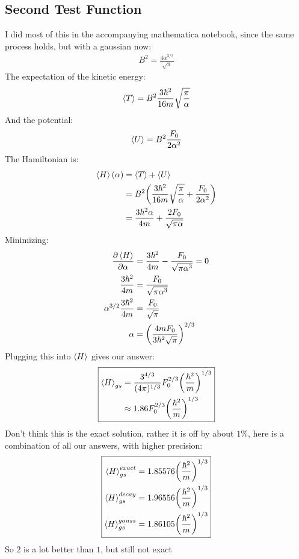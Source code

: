 \documentclass[12pt]{article}
\begin{document}
\subsection{Second Test Function}
I did most of this in the accompanying mathematica notebook, since the same process holds, but with a gaussian now:
\begin{align*}
  B^2=\frac{4\alpha^{3/2}}{\sqrt{\pi}}
\end{align*}
The expectation of the kinetic energy:
\begin{align*}
  \ev{T}=B^2\frac{3\hbar^2}{16m}\sqrt{\frac\pi\alpha}
\end{align*}
And the potential:
\begin{align*}
  \ev{U}=B^2\frac{F_0}{2\alpha^2}
\end{align*}
The Hamiltonian is:
\begin{align*}
  \ev{H}(\alpha)&=\ev{T}+\ev{U}\\
  &=B^2\qty(\frac{3\hbar^2}{16m}\sqrt{\frac{\pi}{\alpha}}+
  \frac{F_0}{2\alpha^2})\\
  &=\frac{3\hbar^2\alpha}{4m}+\frac{2F_0}{\sqrt{\pi\alpha}}
\end{align*}
Minimizing:
\begin{align*}
  \pdv{\ev{H}}{\alpha}&=\frac{3\hbar^2}{4m}-\frac{F_0}{\sqrt{\pi\alpha^3}}=0\\
  \frac{3\hbar^2}{4m}&=\frac{F_0}{\sqrt{\pi\alpha^3}}\\
  \alpha^{3/2}\frac{3\hbar^2}{4m}&=\frac{F_0}{\sqrt{\pi}}\\
  \alpha&=\qty(\frac{4mF_0}{3\hbar^2\sqrt{\pi}})^{2/3}
\end{align*}
Plugging this into $\ev{H}$ gives our answer:
\begin{equation}
  \boxed{\begin{aligned}
    \ev{H}_{gs}&=\frac{3^{4/3}}{(4\pi)^{1/3}}
    F_0^{2/3}\qty(\frac{\hbar^2}{m})^{1/3}\\
    &\approx1.86F_0^{2/3}\qty(\frac{\hbar^2}{m})^{1/3}
  \end{aligned}}
\end{equation}
Don't think this is the exact solution, rather it is off by about $1\%$, here is a combination of all our answers, with higher precision:
\begin{equation}
\boxed{  \begin{aligned}
    \ev{H}_{gs}^{exact}&=1.85576\qty(\frac{\hbar^2}m)^{1/3}\\
    \ev{H}_{gs}^{decay}&=1.96556\qty(\frac{\hbar^2}m)^{1/3}\\
    \ev{H}_{gs}^{gauss}&=1.86105\qty(\frac{\hbar^2}m)^{1/3}
  \end{aligned}}
\end{equation}
So $2$ is a lot better than $1$, but still not exact
\end{document}
